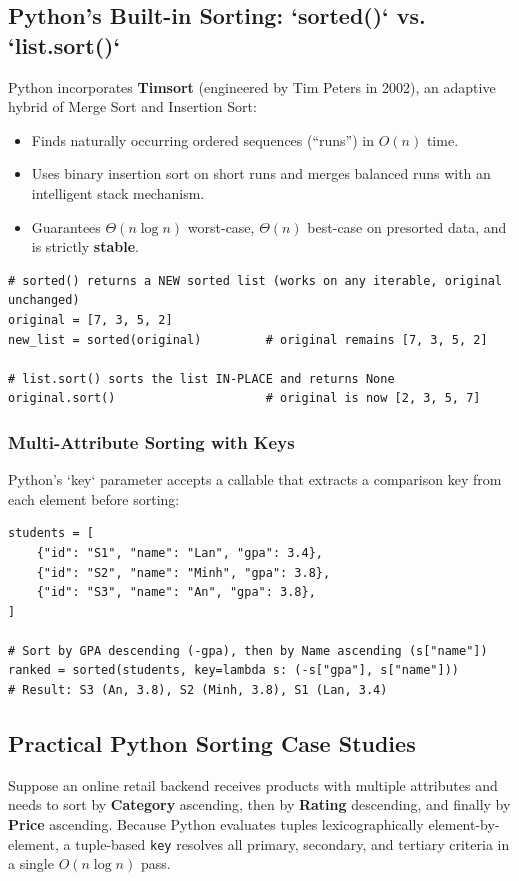 \documentclass[11pt,a4paper]{article}
\begin{document}
\subsection{Python's Built-in Sorting: `sorted()` vs. `list.sort()`}
Python incorporates \textbf{Timsort} (engineered by Tim Peters in 2002), an adaptive hybrid of Merge Sort and Insertion Sort:
\begin{itemize}[itemsep=2pt]
    \item Finds naturally occurring ordered sequences (``runs'') in $O(n)$ time.
    \item Uses binary insertion sort on short runs and merges balanced runs with an intelligent stack mechanism.
    \item Guarantees $\Theta(n \log n)$ worst-case, $\Theta(n)$ best-case on presorted data, and is strictly \textbf{stable}.
\end{itemize}

\begin{lstlisting}[style=pythonstyle]
# sorted() returns a NEW sorted list (works on any iterable, original unchanged)
original = [7, 3, 5, 2]
new_list = sorted(original)         # original remains [7, 3, 5, 2]

# list.sort() sorts the list IN-PLACE and returns None
original.sort()                     # original is now [2, 3, 5, 7]
\end{lstlisting}

\subsubsection{Multi-Attribute Sorting with Keys}
Python's `key` parameter accepts a callable that extracts a comparison key from each element before sorting:
\begin{lstlisting}[style=pythonstyle]
students = [
    {"id": "S1", "name": "Lan", "gpa": 3.4},
    {"id": "S2", "name": "Minh", "gpa": 3.8},
    {"id": "S3", "name": "An", "gpa": 3.8},
]

# Sort by GPA descending (-gpa), then by Name ascending (s["name"])
ranked = sorted(students, key=lambda s: (-s["gpa"], s["name"]))
# Result: S3 (An, 3.8), S2 (Minh, 3.8), S1 (Lan, 3.4)
\end{lstlisting}

\subsection{Practical Python Sorting Case Studies}

\begin{examplebox}
Suppose an online retail backend receives products with multiple attributes and needs to sort by \textbf{Category} ascending, then by \textbf{Rating} descending, and finally by \textbf{Price} ascending. Because Python evaluates tuples lexicographically element-by-element, a tuple-based \lstinline{key} resolves all primary, secondary, and tertiary criteria in a single $O(n \log n)$ pass.
\end{examplebox}
\end{document}
